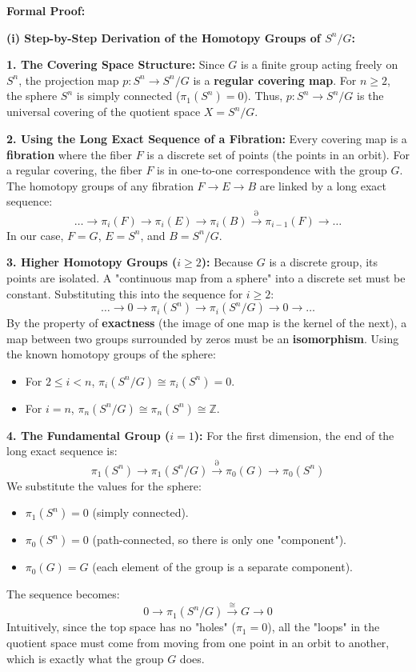 \begin{solution}
\textbf{Formal Proof:}

\textbf{(i) Step-by-Step Derivation of the Homotopy Groups of $S^n/G$:}

\textbf{1. The Covering Space Structure:}
Since $G$ is a finite group acting freely on $S^n$, the projection map $p: S^n \to S^n/G$ is a \textbf{regular covering map}. 
For $n \ge 2$, the sphere $S^n$ is simply connected ($\pi_1(S^n) = 0$). 
Thus, $p: S^n \to S^n/G$ is the universal covering of the quotient space $X = S^n/G$.

\textbf{2. Using the Long Exact Sequence of a Fibration:}
Every covering map is a \textbf{fibration} where the fiber $F$ is a discrete set of points (the points in an orbit). For a regular covering, the fiber $F$ is in one-to-one correspondence with the group $G$.
The homotopy groups of any fibration $F \to E \to B$ are linked by a long exact sequence:
\[ \dots \to \pi_i(F) \to \pi_i(E) \to \pi_i(B) \xrightarrow{\partial} \pi_{i-1}(F) \to \dots \]
In our case, $F = G$, $E = S^n$, and $B = S^n/G$.

\textbf{3. Higher Homotopy Groups ($i \ge 2$):}
Because $G$ is a discrete group, its points are isolated. A "continuous map from a sphere" into a discrete set must be constant.
Substituting this into the sequence for $i \ge 2$:
\[ \dots \to 0 \to \pi_i(S^n) \to \pi_i(S^n/G) \to 0 \to \dots \]
By the property of \textbf{exactness} (the image of one map is the kernel of the next), a map between two groups surrounded by zeros must be an \textbf{isomorphism}.
Using the known homotopy groups of the sphere:
\begin{itemize}
    \item For $2 \le i < n$, $\pi_i(S^n/G) \cong \pi_i(S^n) = 0$.
    \item For $i = n$, $\pi_n(S^n/G) \cong \pi_n(S^n) \cong \mathbb{Z}$.
\end{itemize}

\textbf{4. The Fundamental Group ($i = 1$):}
For the first dimension, the end of the long exact sequence is:
\[ \pi_1(S^n) \to \pi_1(S^n/G) \xrightarrow{\partial} \pi_0(G) \to \pi_0(S^n) \]
We substitute the values for the sphere:
\begin{itemize}
    \item $\pi_1(S^n) = 0$ (simply connected).
    \item $\pi_0(S^n) = 0$ (path-connected, so there is only one "component").
    \item $\pi_0(G) = G$ (each element of the group is a separate component).
\end{itemize}
The sequence becomes:
\[ 0 \to \pi_1(S^n/G) \xrightarrow{\cong} G \to 0 \]
Intuitively, since the top space has no "holes" ($\pi_1=0$), all the "loops" in the quotient space must come from moving from one point in an orbit to another, which is exactly what the group $G$ does.


\end{solution}
